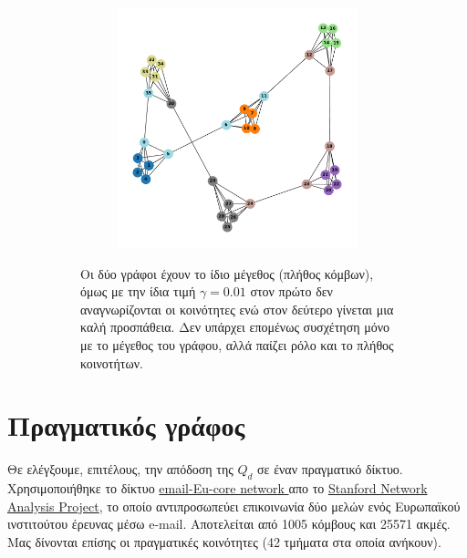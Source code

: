 \documentclass[12pt, letterpaper]{article}
\begin{document}
\begin{figure}
\begin{subfigure}{0.66\linewidth}
\begin{subfigure}{0.45\linewidth}
        \label{}
    \end{subfigure}
    \begin{subfigure}{0.45\linewidth}
        \centering
        \includegraphics[width=\linewidth]{nonconnected_ssize_dcs0.012.pdf}
        \label{}
    \end{subfigure}
    \caption{Οι δύο γράφοι έχουν το ίδιο μέγεθος (πλήθος κόμβων), όμως με την ίδια τιμή 
    $\gamma = 0.01$ στον πρώτο δεν αναγνωρίζονται οι κοινότητες ενώ στον δεύτερο γίνεται 
    μια καλή προσπάθεια. Δεν υπάρχει επομένως συσχέτηση μόνο με το μέγεθος του γράφου, 
    αλλά παίζει ρόλο και το πλήθος κοινοτήτων.}
    \label{ss_dcs}
  \end{subfigure}
  \caption{}
  \label{endplots}
\end{figure}









\section{Πραγματικός γράφος}

Θε ελέγξουμε, επιτέλους, την απόδοση της $Q_d$ σε έναν πραγματικό δίκτυο. 
Χρησιμοποιήθηκε το δίκτυο \href{https://snap.stanford.edu/data/email-Eu-core.html}{
  \textlatin{email-Eu-core network}
} απο το \href{https://snap.stanford.edu/index.html}{\textlatin{Stanford Network Analysis Project}},
το οποίο αντιπροσωπεύει επικοινωνία δύο μελών ενός Ευρωπαϊκού ινστιτούτου
έρευνας μέσω \textlatin{e-mail}. 
Αποτελείται από 1005 κόμβους και 25571 ακμές.
Μας δίνονται επίσης οι πραγματικές κοινότητες (42 τμήματα στα οποία ανήκουν).
\end{document}
